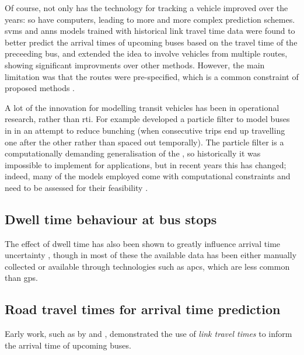Of course, not only has the technology for tracking a vehicle improved over the years: so have computers, leading to more and more complex prediction schemes. \Glspl{svm} \citep{Yu_2006,Yu_2010} and \glspl{ann} \citep{Mazloumi_2012,cn} models trained with historical link travel time data were found to better predict the arrival times of upcoming buses based on the travel time of the preceeding bus, and \citet{Yu_2011} extended the idea to involve vehicles from multiple routes, showing significant improvments over other methods. However, the main limitation was that the routes were pre-specified, which is a common constraint of proposed methods \citep{Chang_2010,Celan_2017,Celan_2018}.


A lot of the innovation for modelling transit vehicles has been in operational research, rather than \gls{rti}. For example \citet{Hans_2015} developed a particle filter to model buses in \rt{} in an attempt to reduce bunching (when consecutive trips end up travelling one after the other rather than spaced out temporally). The particle filter is a computationally demanding generalisation of the \kf{}, so historically it was impossible to implement for \rt{} applications, but in recent years this has changed; indeed, many of the \rt{} models employed come with computational constraints and need to be assessed for their feasibility \citep{Chang_2010,Cats_2016}.




\subsection{Dwell time behaviour at bus stops}
\label{sec:intro_dwell}

The effect of dwell time has also been shown to greatly influence arrival time uncertainty \citep{Jeong_2005,Meng_2013,Shen_2013,Robinson_2013,Gong_2013,Wang_2016}, though in most of these the available data has been either manually collected or available through technologies such as \glspl{apc}, which are less common than \gls{gps}.


\subsection{Road travel times for arrival time prediction}
\label{sec:intro_travel_time}

Early work, such as by \citet{Reinhoudt_1997} and \citet{Wall_1999}, demonstrated the use of \emph{link travel times} to inform the arrival time of upcoming buses.

